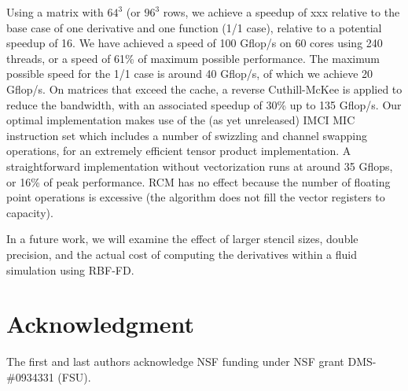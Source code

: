 \documentclass[10pt,conference,compsocconf]{IEEEtran}
\newcommand{\todo}[1]{{\color{red}\textbf{\hl{#1}}\xspace}}
\begin{document}
Using a matrix with $64^3$ (or $96^3$ rows, we achieve a speedup of
xxx relative to the base case of one derivative and one function (1/1
case), relative to a potential speedup of 16. We have achieved a
speed of 100 Gflop/s on 60 cores using 240 threads, or a speed of 61\% of
maximum possible performance. The maximum possible speed for the 1/1
case is around 40 Gflop/s, of which we achieve 20 Gflop/s. On matrices
that exceed the cache, a reverse Cuthill-McKee is applied to reduce the
bandwidth, with an associated speedup of 30\% up to 135 Gflop/s. Our
optimal implementation makes use of the (as yet unreleased) IMCI MIC instruction set 
which includes a number of swizzling and channel swapping operations, for an
extremely efficient tensor product implementation. A straightforward
implementation without vectorization runs at around 35 Gflops, or 16\% of peak
performance. RCM has no effect because the number of floating point
operations is excessive (the algorithm does not fill the vector
registers to capacity).

In a future work, we will examine the effect of larger stencil sizes,
double precision, and the actual cost of computing the derivatives
within a fluid simulation using RBF-FD.



\section*{Acknowledgment}
The first and last authors acknowledge NSF funding under NSF grant DMS-\#0934331 (FSU). 



\end{document}
